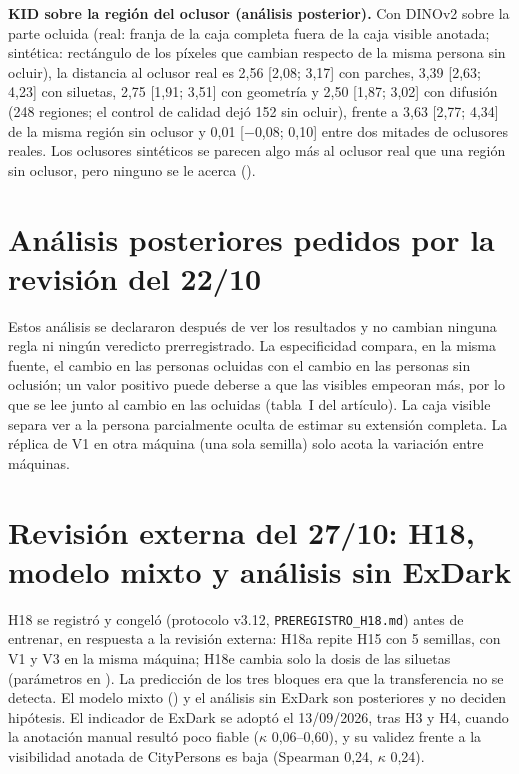 \documentclass[10pt]{article}
\begin{document}
\noindent\textbf{KID sobre la región del oclusor (análisis posterior).} Con DINOv2 sobre la parte ocluida (real: franja de la caja completa fuera de la caja visible anotada; sintética: rectángulo de los píxeles que cambian respecto de la misma persona sin ocluir), la distancia al oclusor real es 2,56 [2,08; 3,17] con parches, 3,39 [2,63; 4,23] con siluetas, 2,75 [1,91; 3,51] con geometría y 2,50 [1,87; 3,02] con difusión (248 regiones; el control de calidad dejó 152 sin ocluir), frente a 3,63 [2,77; 4,34] de la misma región sin oclusor y 0,01 [$-$0,08; 0,10] entre dos mitades de oclusores reales. Los oclusores sintéticos se parecen algo más al oclusor real que una región sin oclusor, pero ninguno se le acerca ().

\section{Análisis posteriores pedidos por la revisión del 22/10}
Estos análisis se declararon después de ver los resultados y no cambian ninguna regla ni ningún veredicto prerregistrado. La especificidad compara, en la misma fuente, el cambio en las personas ocluidas con el cambio en las personas sin oclusión; un valor positivo puede deberse a que las visibles empeoran más, por lo que se lee junto al cambio en las ocluidas (tabla~I del artículo). La caja visible separa ver a la persona parcialmente oculta de estimar su extensión completa. La réplica de V1 en otra máquina (una sola semilla) solo acota la variación entre máquinas.



\section{Revisión externa del 27/10: H18, modelo mixto y análisis sin ExDark}
H18 se registró y congeló (protocolo v3.12, \texttt{PREREGISTRO\_H18.md}) antes de entrenar, en respuesta a la revisión externa: H18a repite H15 con 5 semillas, con V1 y V3 en la misma máquina; H18e cambia solo la dosis de las siluetas (parámetros en ). La predicción de los tres bloques era que la transferencia no se detecta. El modelo mixto () y el análisis sin ExDark son posteriores y no deciden hipótesis. El indicador de ExDark se adoptó el 13/09/2026, tras H3 y H4, cuando la anotación manual resultó poco fiable ($\kappa$ 0,06--0,60), y su validez frente a la visibilidad anotada de CityPersons es baja (Spearman 0,24, $\kappa$ 0,24).
\end{document}
